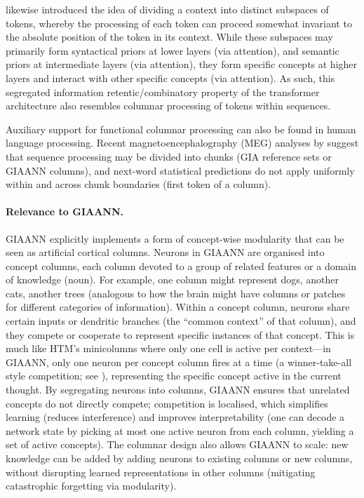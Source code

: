 \citet{bahdanau2015neural} likewise introduced the idea of dividing a context into distinct subspaces of tokens, whereby the processing of each token can proceed somewhat invariant to the absolute position of the token in its context. While these subspaces may primarily form syntactical priors at lower layers (via attention), and semantic priors at intermediate layers (via attention), they form specific concepts at higher layers and interact with other specific concepts (via attention). As such, this segregated information retentic/combinatory property of the transformer architecture also resembles columnar processing of tokens within sequences.

Auxiliary support for functional columnar processing can also be found in human language processing. Recent magnetoencephalography (MEG) analyses by \citet{zou2026constituent} suggest that sequence processing may be divided into chunks (GIA reference sets or GIAANN columns), and next-word statistical predictions do not apply uniformly within and across chunk boundaries (first token of a column).


\paragraph{Relevance to GIAANN.}
GIAANN explicitly implements a form of concept-wise modularity that can be seen as artificial cortical columns.
Neurons in GIAANN are organised into concept columns, each column devoted to a group of related features or a domain of knowledge (noun).
For example, one column might represent dogs, another cats, another trees (analogous to how the brain might have columns or patches for different categories of information).
Within a concept column, neurons share certain inputs or dendritic branches (the ``common context'' of that column), and they compete or cooperate to represent specific instances of that concept.
This is much like HTM’s minicolumns where only one cell is active per context---in GIAANN, only one neuron per concept column fires at a time (a winner-take-all style competition; see \citealt{maass2000winnerTakeAll}), representing the specific concept active in the current thought.
By segregating neurons into columns, GIAANN ensures that unrelated concepts do not directly compete; competition is localised, which simplifies learning (reduces interference) and improves interpretability (one can decode a network state by picking at most one active neuron from each column, yielding a set of active concepts).
The columnar design also allows GIAANN to scale: new knowledge can be added by adding neurons to existing columns or new columns, without disrupting learned representations in other columns (mitigating catastrophic forgetting via modularity).

